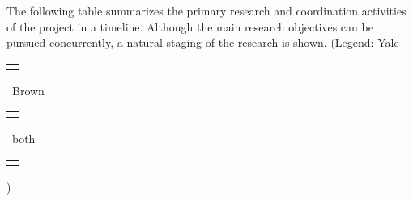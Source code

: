 \def\graycell{\cellcolor[RGB]{200,200,200}}
\def\acell{\cellcolor[rgb]{.98,.81,.69}}
\def\bcell{\cellcolor[rgb]{0.54, 0.81, 0.94}}
\def\ccell{\cellcolor[rgb]{0.98, 0.91, 0.71}}
\def\dcell{\cellcolor[rgb]{0.64, 0.76, 0.68}}
\def\ecell{\cellcolor[rgb]{0.96, 0.76, 0.76}}
\def\g{}
\def\g{\graycell}
\def\a{\acell}
\def\b{\bcell}
\def\c{\ccell}
\def\d{\dcell}
\def\e{\ecell}
\def\yale{\bcell}
\def\brown{\acell}
\def\both{\ecell}


\def\topic#1{\multicolumn{13}{c}{}\\
  \multicolumn{1}{l}{\bf #1 } & \multicolumn{12}{c}{} \\[3pt] \hline}
\def\numb#1{\hbox to 13pt{\hfill \footnotesize #1\hfill}}
\def\ffour{\numb{Q4}}
\def\three{\numb{Q3}}
\def\two{\numb{Q2}}
\def\one{\numb{Q1}}
\def\four{\multicolumn{1}{c|}{\ffour}}


\vskip10pt
\noindent 
The following table summarizes the primary research and coordination
activities of the project in a timeline. 
Although the main research objectives 
can be pursued concurrently, a natural staging of the research is shown.
\def\minicell#1{{\small \begin{tabular}{c}#1\end{tabular}}}
(Legend: Yale \minicell{\yale}\, Brown \minicell{\brown}\, both \minicell{\both})


